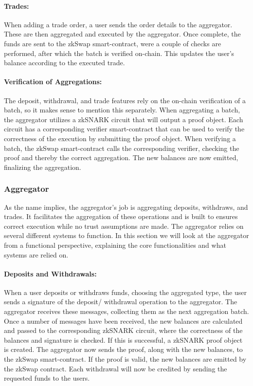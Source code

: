 \documentclass[../../thesis.tex]{subfiles}
\begin{document}
\paragraph{Trades:}
When adding a trade order, a user sends the order details to the aggregator. These are then aggregated and executed by the aggregator. Once complete, the funds are sent to the zkSwap smart-contract, were a couple of checks are performed, after which the batch is verified on-chain. This updates the user's balance according to the executed trade.

\paragraph{Verification of Aggregations:}
The deposit, withdrawal, and trade features rely on the on-chain verification of a batch, so it makes sense to mention this separately. When aggregating a batch, the aggregator utilizes a zkSNARK circuit that will output a proof object. Each circuit has a corresponding verifier smart-contract that can be used to verify the correctness of the execution by submitting the proof object. When verifying a batch, the zkSwap smart-contract calls the corresponding verifier, checking the proof and thereby the correct aggregation. The new balances are now emitted, finalizing the aggregation.

\subsubsection{Aggregator}
As the name implies, the aggregator's job is aggregating deposits, withdraws, and trades. It facilitates the aggregation of these operations and is built to ensures correct execution while no trust assumptions are made. The aggregator relies on several different systems to function. In this section we will look at the aggregator from a functional perspective, explaining the core functionalities and what systems are relied on.

\paragraph{Deposits and Withdrawals:}
When a user deposits or withdraws funds, choosing the aggregated type, the user sends a signature of the deposit/ withdrawal operation to the aggregator. The aggregator receives these messages, collecting them as the next aggregation batch. Once a number of messages have been received, the new balances are calculated and passed to the corresponding zkSNARK circuit, where the correctness of the balances and signature is checked. If this is successful, a zkSNARK proof object is created. The aggregator now sends the proof, along with the new balances, to the zkSwap smart-contract. If the proof is valid, the new balances are emitted by the zkSwap contract. Each withdrawal will now be credited by sending the requested funds to the users. 
\end{document}
